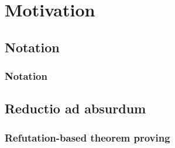 
\section{Motivation}
\subsection{Notation}
\begin{frame}
	\frametitle{Notation}
	
\end{frame}

\subsection{Reductio ad absurdum}

\begin{frame}
	\frametitle{Refutation-based theorem proving}
	
\end{frame}

\begin{frame}
	
\end{frame}
	
\begin{frame}
	
	
\end{frame}

\begin{frame}
	
\end{frame}
	

